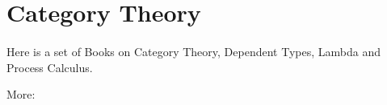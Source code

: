 \documentclass[11pt]{article}
\begin{document}
\section*{Category Theory}
\paragraph{}
Here is a set of Books on Category Theory, Dependent Types, Lambda and Process Calculus.

More: 




\@br
{}


\end{document}
